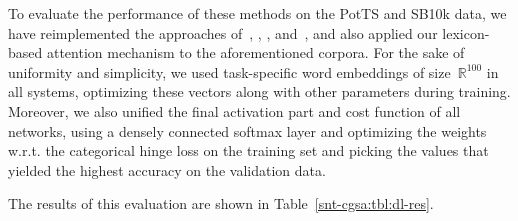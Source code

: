To evaluate the performance of these methods on the PotTS and SB10k
data, we have reimplemented the approaches of~\citet{Yessenalina:11},
\citet{Socher:11,Socher:12,Socher:13}, \citet{Severyn:15},
and~\citet{Baziotis:17}, and also applied our lexicon-based attention
mechanism to the aforementioned corpora.  For the sake of uniformity
and simplicity, we used task-specific word embeddings of
size~$\mathbb{R}^{100}$ in all systems, optimizing these vectors along
with other parameters during training.  Moreover, we also unified the
final activation part and cost function of all networks, using a
densely connected softmax layer and optimizing the weights w.r.t. the
categorical hinge loss on the training set and picking the values that
yielded the highest accuracy on the validation data.

The results of this evaluation are shown in
Table~\ref{snt-cgsa:tbl:dl-res}.

